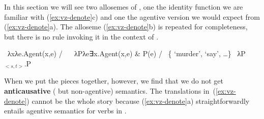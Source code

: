\begin{exe}
\begin{xlist}
\begin{xlist}
\begin{exe}
\begin{xlist}
\begin{xlist}
\begin{exe}
\begin{xlist}
\begin{xlist}
\begin{exe}
\begin{exe}
\begin{xlist}
\begin{exe}
\begin{exe}
\begin{xlist}
\begin{exe}
\begin{exe}
\begin{exe}
\begin{exe}
\begin{exe}
\begin{xlist}
\begin{exe}
\begin{xlist}
\begin{exe}
\begin{exe}
\begin{xlist}
\begin{exe}
\begin{xlist}
\begin{exe}
\begin{exe}
\begin{exe}
\begin{xlist}
\begin{exe}
\begin{exe}
\begin{exe}
\begin{xlist}
\begin{exe}
\begin{xlist}
\begin{exe}
\begin{xlist}
\begin{exe}
\begin{xlist}
\begin{exe}
\begin{exe}
\begin{exe}
\begin{exe}
\begin{xlist}
\begin{exe}
\begin{xlist}
\begin{exe}
\begin{xlist}
\begin{exe}
\begin{xlist}
\begin{exe}
\begin{xlist}
\begin{exe}
\begin{xlist}
\begin{exe}
\begin{exe}
\begin{exe}
\begin{exe}
\begin{xlist}
\begin{exe}
\begin{xlist}
\begin{exe}
\begin{xlist}
\begin{exe}
\begin{exe}
\begin{xlist}
\begin{exe}
\begin{exe}
\begin{exe}
\begin{exe}
\begin{xlist}
\begin{xlist}
\begin{exe}
\begin{xlist}
\begin{exe}
\begin{exe}
\begin{exe}
\begin{xlist}
\begin{exe}
\begin{exe}
\begin{xlist}
\begin{exe}
\begin{exe}
\begin{exe}
\begin{xlist}
\begin{xlist}
\begin{exe}
\begin{xlist}
\begin{exe}
\begin{exe}
\begin{exe}
\begin{exe}
\begin{xlist}
\begin{exe}
\begin{xlist}
In this section we will see two allosemes of {\vz}, one the identity function we are familiar with (\ref{ex:vz-denote}c) and one the agentive version we would expect from {\va} (\ref{ex:vz-denote}a). The  alloseme (\ref{ex:vz-denote}b) is repeated for completeness, but there is no rule invoking it in the context of {\va}.
 \begin{exe}
 \ex  \label{ex:vz-denote} 
 \begin{xlist} 
 	\ex  \denote{\vz} \lra~λxλe.Agent(x,e) / \trace~\va 
 	\ex  \denote{\vz} \lra~λPλe∃x.Agent(x,e) \& P(e) / \trace~\{ `murder',  `say’, \dots\} 
 	\ex  \denote{\vz} \lra~λP$_{<s,t>}$.P 
 \z
\z 

When we put the pieces together, however, we find that we do not get \textbf{anticausative} ( but non-agentive) semantics. The translations in~(\ref{ex:vz-denote}) cannot be the whole story because (\ref{ex:vz-denote}a) straightforwardly entails agentive semantics for verbs in {\thit}.


\end{xlist}
\end{exe}
\end{xlist}
\end{exe}
\end{xlist}
\end{exe}
\end{exe}
\end{exe}
\end{exe}
\end{xlist}
\end{exe}
\end{xlist}
\end{xlist}
\end{exe}
\end{exe}
\end{exe}
\end{xlist}
\end{exe}
\end{exe}
\end{xlist}
\end{exe}
\end{exe}
\end{exe}
\end{xlist}
\end{exe}
\end{xlist}
\end{xlist}
\end{exe}
\end{exe}
\end{exe}
\end{exe}
\end{xlist}
\end{exe}
\end{exe}
\end{xlist}
\end{exe}
\end{xlist}
\end{exe}
\end{xlist}
\end{exe}
\end{exe}
\end{exe}
\end{exe}
\end{xlist}
\end{exe}
\end{xlist}
\end{exe}
\end{xlist}
\end{exe}
\end{xlist}
\end{exe}
\end{xlist}
\end{exe}
\end{xlist}
\end{exe}
\end{exe}
\end{exe}
\end{exe}
\end{xlist}
\end{exe}
\end{xlist}
\end{exe}
\end{xlist}
\end{exe}
\end{xlist}
\end{exe}
\end{exe}
\end{exe}
\end{xlist}
\end{exe}
\end{exe}
\end{exe}
\end{xlist}
\end{exe}
\end{xlist}
\end{exe}
\end{exe}
\end{xlist}
\end{exe}
\end{xlist}
\end{exe}
\end{exe}
\end{exe}
\end{exe}
\end{exe}
\end{xlist}
\end{exe}
\end{exe}
\end{xlist}
\end{exe}
\end{exe}
\end{xlist}
\end{xlist}
\end{exe}
\end{xlist}
\end{xlist}
\end{exe}
\end{xlist}
\end{xlist}
\end{exe}
